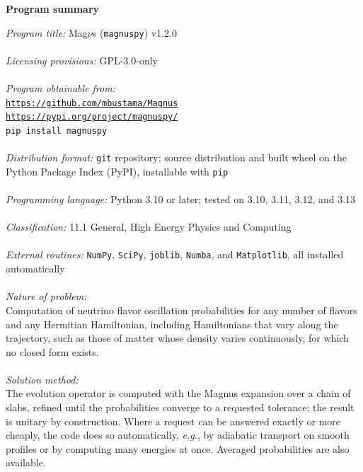 \documentclass[final,5p,times,twocolumn,sort,compress]{elsarticle}
\makeatletter
\newcommand{\eg}{{\it e.g.}}
\DeclareRobustCommand{\_}{%
  \ifmmode\nfss@text{\textunderscore}\else\textunderscore\allowbreak\fi}
\makeatother
\begin{document}
\noindent
{\bf Program summary}
\smallskip

\begin{small}

\noindent
{\em Program title:} Mag$\nu$s ({\tt magnuspy}) v1.2.0 \\ \\
\smallskip
{\em Licensing provisions:} GPL-3.0-only \\ \\
\smallskip
{\em Program obtainable from:} \\
\href{https://github.com/mbustama/Magnus}{\tt https://github.com/mbustama/Magnus} \\
\href{https://pypi.org/project/magnuspy/}{\tt https://pypi.org/project/magnuspy/} \\
{\tt pip install magnuspy} \\ \\
\smallskip
{\em Distribution format:} {\tt git} repository; source distribution and built wheel on the Python Package Index (PyPI), installable with {\tt pip} \\ \\
\smallskip
{\em Programming language:} Python 3.10 or later; tested on 3.10, 3.11, 3.12, and 3.13 \\ \\
\smallskip
{\em Classification:} 11.1 General, High Energy Physics and Computing \\ \\
\smallskip
{\em External routines:} {\tt NumPy}, {\tt SciPy}, {\tt joblib}, {\tt Numba}, and {\tt Matplotlib}, all installed automatically \\ \\
\smallskip
{\em Nature of problem:} \\
Computation of neutrino flavor oscillation probabilities for any number of flavors and any Hermitian Hamiltonian, including Hamiltonians that vary along the trajectory, such as those of matter whose density varies continuously, for which no closed form exists. \\ \\
\smallskip
{\em Solution method:}\\
The evolution operator is computed with the Magnus expansion over a chain of slabs, refined until the probabilities converge to a requested tolerance; the result is unitary by construction. Where a request can be answered exactly or more cheaply, the code does so automatically, \eg, by adiabatic transport on smooth profiles or by computing many energies at once. Averaged probabilities are also available. \\ \\

\end{small}
\end{document}
